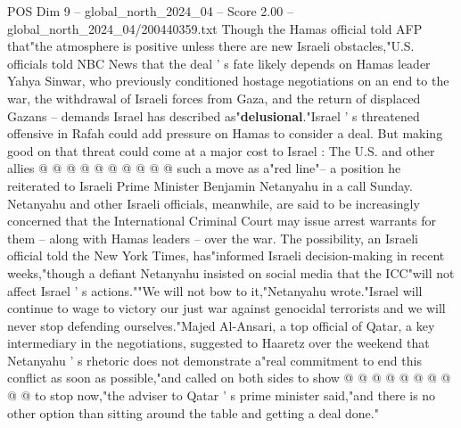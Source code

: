 \begin{textsample}{POS Dim 9 – global\_north\_2024\_04 – Score 2.00 – global\_north\_2024\_04/200440359.txt}
Though the Hamas official told AFP that"the atmosphere is positive unless there are new Israeli obstacles,"U.S. officials told NBC News that the deal ' s fate likely depends on Hamas leader Yahya Sinwar, who previously conditioned hostage negotiations on an end to the war, the withdrawal of Israeli forces from Gaza, and the return of displaced Gazans -- demands Israel has described as"\textbf{delusional}."Israel ' s threatened offensive in Rafah could add pressure on Hamas to consider a deal.
But making good on that threat could come at a major cost to Israel : The U.S. and other allies @ @ @ @ @ @ @ @ @ @ such a move as a"red line"-- a position he reiterated to Israeli Prime Minister Benjamin Netanyahu in a call Sunday.
Netanyahu and other Israeli officials, meanwhile, are said to be increasingly concerned that the International Criminal Court may issue arrest warrants for them -- along with Hamas leaders -- over the war.
The possibility, an Israeli official told the New York Times, has"informed Israeli decision-making in recent weeks,"though a defiant Netanyahu insisted on social media that the ICC"will not affect Israel ' s actions.""We will not bow to it,"Netanyahu wrote."Israel will continue to wage to victory our just war against genocidal terrorists and we will never stop defending ourselves."Majed Al-Ansari, a top official of Qatar, a key intermediary in the negotiations, suggested to Haaretz over the weekend that Netanyahu ' s rhetoric does not demonstrate a"real commitment to end this conflict as soon as possible,"and called on both sides to show @ @ @ @ @ @ @ @ @ @ to stop now,"the adviser to Qatar ' s prime minister said,"and there is no other option than sitting around the table and getting a deal done."

\end{textsample}
